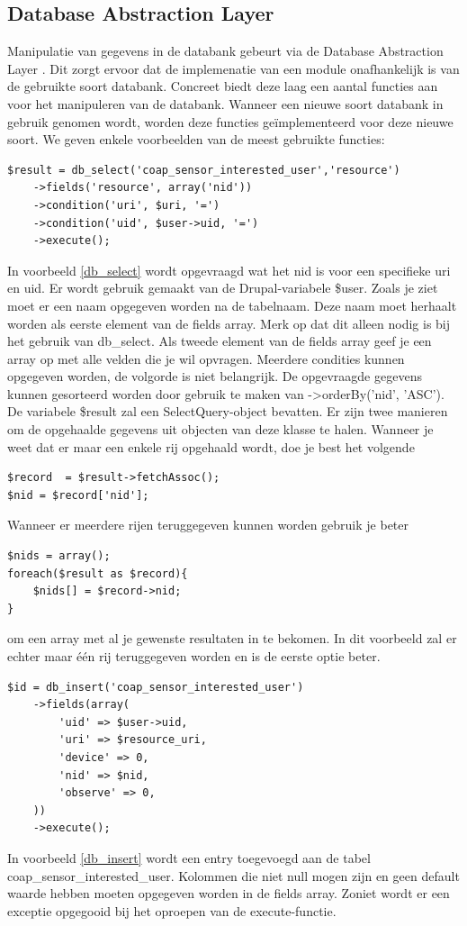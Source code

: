 \subsection{Database Abstraction Layer}
Manipulatie van gegevens in de databank gebeurt via de Database Abstraction Layer \cite{databaseAbstractionLayer}. Dit zorgt ervoor dat de implemenatie van een module onafhankelijk is van de gebruikte soort databank. Concreet biedt deze laag een aantal functies aan voor het manipuleren van de databank. Wanneer een nieuwe soort databank in gebruik genomen wordt, worden deze functies ge\"{i}mplementeerd voor deze nieuwe soort. We geven enkele voorbeelden van de meest gebruikte functies:
\lstset{language=PHP}
\begin{lstlisting}[label=db_select,caption=Voorbeeld gebruik van db\_select]
$result = db_select('coap_sensor_interested_user','resource')
	->fields('resource', array('nid'))
	->condition('uri', $uri, '=')
	->condition('uid', $user->uid, '=')
	->execute();
\end{lstlisting}
In voorbeeld \ref{db_select} wordt opgevraagd wat het nid is voor een specifieke uri en uid. Er wordt gebruik gemaakt van de Drupal-variabele \$user. Zoals je ziet moet er een naam opgegeven worden na de tabelnaam. Deze naam moet herhaalt worden als eerste element van de fields array. Merk op dat dit alleen nodig is bij het gebruik van db\_select. Als tweede element van de fields array geef je een array op met alle velden die je wil opvragen. Meerdere condities kunnen opgegeven worden, de volgorde is niet belangrijk. De opgevraagde gegevens kunnen gesorteerd worden door gebruik te maken van -\textgreater orderBy('nid', 'ASC').\\

De variabele \$result zal een SelectQuery-object bevatten. Er zijn twee manieren om de opgehaalde gegevens uit objecten van deze klasse te halen. Wanneer je weet dat er maar een enkele rij opgehaald wordt, doe je best het volgende
\lstset{language=PHP}
\begin{lstlisting}
$record  = $result->fetchAssoc();
$nid = $record['nid'];
\end{lstlisting} 
Wanneer er meerdere rijen teruggegeven kunnen worden gebruik je beter
\lstset{language=PHP}
\begin{lstlisting}
$nids = array();
foreach($result as $record){
	$nids[] = $record->nid;
}
\end{lstlisting} 
om een array met al je gewenste resultaten in te bekomen. In dit voorbeeld zal er echter maar \'{e}\'{e}n rij teruggegeven worden en is de eerste optie beter.
\lstset{language=PHP}
\begin{lstlisting}[label=db_insert,caption=Voorbeeld gebruik van db\_insert]
$id = db_insert('coap_sensor_interested_user')
	->fields(array(
		'uid' => $user->uid,
		'uri' => $resource_uri,
		'device' => 0,
		'nid' => $nid,
		'observe' => 0,
	))
	->execute();
\end{lstlisting}
In voorbeeld \ref{db_insert} wordt een entry toegevoegd aan de tabel coap\_sensor\_interested\_user. Kolommen die niet null mogen zijn en geen default waarde hebben moeten opgegeven worden in de fields array. Zoniet wordt er een exceptie opgegooid bij het oproepen van de execute-functie.

